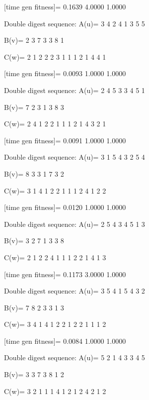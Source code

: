 [time gen fitness]=
    0.1639    4.0000    1.0000

Double digest sequence:
A(u)=
     3     4     2     4     1     3     5     5

B(v)=
     2     3     7     3     3     8     1

C(w)=
     2     1     2     2     2     3     1     1     1     2     1     4     4     1

[time gen fitness]=
    0.0093    1.0000    1.0000

Double digest sequence:
A(u)=
     2     4     5     3     3     4     5     1

B(v)=
     7     2     3     1     3     8     3

C(w)=
     2     4     1     2     2     1     1     1     2     1     4     3     2     1

[time gen fitness]=
    0.0091    1.0000    1.0000

Double digest sequence:
A(u)=
     3     1     5     4     3     2     5     4

B(v)=
     8     3     3     1     7     3     2

C(w)=
     3     1     4     1     2     2     1     1     1     2     4     1     2     2

[time gen fitness]=
    0.0120    1.0000    1.0000

Double digest sequence:
A(u)=
     2     5     4     3     4     5     1     3

B(v)=
     3     2     7     1     3     3     8

C(w)=
     2     1     2     2     4     1     1     1     2     2     1     4     1     3

[time gen fitness]=
    0.1173    3.0000    1.0000

Double digest sequence:
A(u)=
     3     5     4     1     5     4     3     2

B(v)=
     7     8     2     3     3     1     3

C(w)=
     3     4     1     4     1     2     2     1     2     2     1     1     1     2

[time gen fitness]=
    0.0084    1.0000    1.0000

Double digest sequence:
A(u)=
     5     2     1     4     3     3     4     5

B(v)=
     3     3     7     3     8     1     2

C(w)=
     3     2     1     1     1     4     1     2     1     2     4     2     1     2

